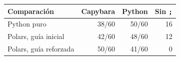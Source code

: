 \begin{tabular}{@{}lrrr@{}}
\toprule
Comparación & Capybara & Python & Sin \texttt{;} \\
\midrule
Python puro & 38/60 & 50/60 & 16 \\
Polars, guía inicial & 42/60 & 48/60 & 12 \\
Polars, guía reforzada & 50/60 & 41/60 & 0 \\
\bottomrule
\end{tabular}
